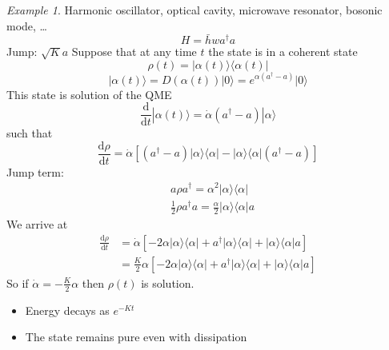 \documentclass[a4paper]{book}
\theoremstyle{definition}
\theoremstyle{remark}
\newtheorem*{example}{Example}
\begin{document}
\begin{example}
    Harmonic oscillator, optical cavity, microwave resonator, bosonic mode, \dots
    \begin{equation}
        H = \bar{h}w a^\dagger a 
    \end{equation}
    Jump: $\sqrt{K}a$\newline
    Suppose that at any time $t$ the state is in a coherent state 
    \begin{equation}
        \rho(t) = |\alpha(t)\rangle\langle\alpha(t)|
    \end{equation}
    \begin{equation}
        |\alpha(t)\rangle = D(\alpha(t))|0\rangle = e^{\alpha( a^\dagger - a)}|0\rangle 
    \end{equation}
    This state is solution of the QME 
    \begin{equation}
        \frac{\text{d}}{\text{d}t}|\alpha(t)\rangle = \dot{\alpha}(a^\dagger - a) |\alpha\rangle 
    \end{equation}
    such that 
    \begin{equation}
        \frac{\text{d}\rho}{\text{d}t} = \dot{\alpha}\left[(a^\dagger - a)|\alpha\rangle\langle\alpha| - |\alpha\rangle\langle\alpha|(a^\dagger - a)\right]
    \end{equation}
    Jump term: 
    \begin{equation}
        \begin{aligned}
            &a\rho a^\dagger = \alpha^2 |\alpha\rangle\langle\alpha| \\
            &\frac{1}{2} \rho a^\dagger a = \frac{\alpha}{2}|\alpha\rangle\langle\alpha| a
        \end{aligned}
    \end{equation}
    We arrive at 
    \begin{equation}
        \begin{aligned}
            \frac{\text{d}\rho}{\text{d}t} &= \dot{\alpha}[-2\alpha |\alpha \rangle\langle \alpha| + a^\dagger|\alpha \rangle\langle \alpha| + |\alpha \rangle\langle \alpha|a ] \\
            &= \frac{K}{2}\alpha \left[-2\alpha |\alpha \rangle\langle \alpha| + a^\dagger|\alpha \rangle\langle \alpha| + |\alpha \rangle\langle \alpha|a \right]
        \end{aligned}
    \end{equation}
    So if $\dot{\alpha} = -\frac{K}{2}\alpha$ then $\rho(t)$ is solution. 
    \begin{itemize}
        \item Energy decays as $e^{-Kt}$
        \item The state remains pure even with dissipation 
    \end{itemize}
\end{example}
\end{document}

